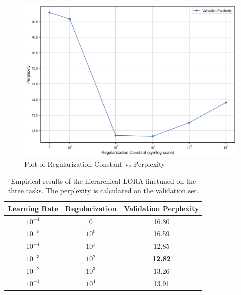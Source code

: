 \documentclass{article}
\begin{document}
\begin{figure}[h]
    \centering
    \includegraphics[width=\textwidth]{figures/results_plot.png}
    \caption{Plot of Regularization Constant vs Perplexity}
    \label{fig:results_plot}
\end{figure}

\begin{table}[h]
\centering
\caption{Empirical results of the hierarchical LORA finetuned on the three tasks. The perplexity is calculated on the validation set.}
\label{tbl:results}
\begin{tabular}{ccc}
    \toprule
    Learning Rate & Regularization & Validation Perplexity \\
    \midrule
        $10^{-4}$ &              0 &                 16.80 \\
        $10^{-5}$ &       $10^{0}$ &                 16.59 \\
        $10^{-4}$ &       $10^{1}$ &                 12.85 \\
        $10^{-3}$ &       $10^{2}$ &                 \textbf{12.82} \\
        $10^{-2}$ &       $10^{3}$ &                 13.26 \\
        $10^{-1}$ &       $10^{4}$ &                 13.91 \\
    \bottomrule
    \end{tabular}
\end{table}
\end{document}
